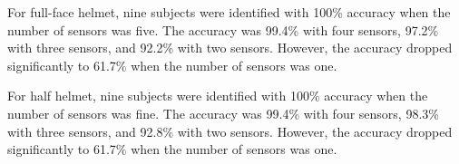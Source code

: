 \documentclass[sigchi,authordraft]{acmart}
\newcommand\tabref[1]{\textbf{Table~\ref{tab:#1}}}
\begin{document}

For full-face helmet, nine subjects were identified with 100\% accuracy when the number of sensors was five. The accuracy was 99.4\% with four sensors, 97.2\% with three sensors, and 92.2\% with two sensors. However, the accuracy dropped significantly to 61.7\% when the number of sensors was one. 
\par




For half helmet, nine subjects were identified with 100\% accuracy when the number of sensors was fine. The accuracy was 99.4\% with four sensors, 98.3\% with three sensors, and 92.8\% with two sensors. However, the accuracy dropped significantly to 61.7\% when the number of sensors was one.\par

\end{document}
